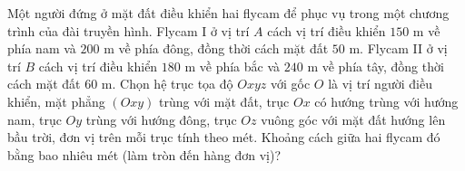 \begin{bt}%
        Một người đứng ở mặt đất điều khiển hai flycam để phục vụ trong một chương trình của đài truyền hình. Flycam I ở vị trí $A$ cách vị trí điều khiển $150$ m về phía nam và $200$ m về phía đông, đồng thời cách mặt đất $50$ m. Flycam II ở vị trí $B$ cách vị trí điều khiển $180$ m về phía bắc và $240$ m về phía tây, đồng thời cách mặt đất $60$ m. Chọn hệ trục tọa độ $Oxyz$ với gốc $O$ là vị trí người điều khiển, mặt phẳng $(Oxy)$ trùng với mặt đất, trục $Ox$ có hướng trùng với hướng nam, trục $Oy$ trùng với hướng đông, trục $Oz$ vuông góc với mặt đất hướng lên bầu trời, đơn vị trên mỗi trục tính theo mét. Khoảng cách giữa hai flycam đó bằng bao nhiêu mét (làm tròn đến hàng đơn vị)?	
    \end{bt}

